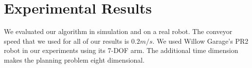 \documentclass[a4paper]{report}
\begin{document}
%
%
%    
%

\section{Experimental Results}
\label{sec:eval2}

We evaluated our algorithm in simulation and on a real robot. The conveyor speed that we used for all of our results is $0.2m/s$. We used Willow Garage's PR2 robot in our experiments using its 7-DOF arm. The additional time dimension makes the planning problem eight dimensional.
\end{document}
